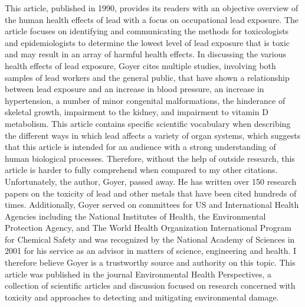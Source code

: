 \documentclass{article}\usepackage[]{graphicx}\usepackage[]{color}
\begin{document}
This article, published in 1990, provides its readers with an objective overview of the human health effects of lead with a focus on occupational lead exposure. The article focuses on identifying and communicating the methods for toxicologists and epidemiologists to determine the lowest level of lead exposure that is toxic and may result in an array of harmful health effects. In discussing the various health effects of lead exposure, Goyer cites multiple studies, involving both samples of lead workers and the general public, that have shown a relationship between lead exposure and an increase in blood pressure, an increase in hypertension, a number of minor congenital malformations, the hinderance of skeletal growth, impairment to the kidney, and impairment to vitamin D metabolism. This article contains specific scientific vocabulary when describing the different ways in which lead affects a variety of organ systems, which suggests that this article is intended for an audience with a strong understanding of human biological processes. Therefore, without the help of outside research, this article is harder to fully comprehend when compared to my other citations. Unfortunately, the author, Goyer, passed away. He has written over 150 research papers on the toxicity of lead and other metals that have been cited hundreds of times. Additionally, Goyer served on committees for US and International Health Agencies including the National Institutes of Health, the Environmental Protection Agency, and The World Health Organization International Program for Chemical Safety and was recognized by the National Academy of Sciences in 2001 for his service as an advisor in matters of science, engineering and health. I therefore believe Goyer is a trustworthy source and authority on this topic. This article was published in the journal Environmental Health Perspectives, a collection of scientific articles and discussion focused on research concerned with toxicity and approaches to detecting and mitigating environmental damage. 
\end{document}
